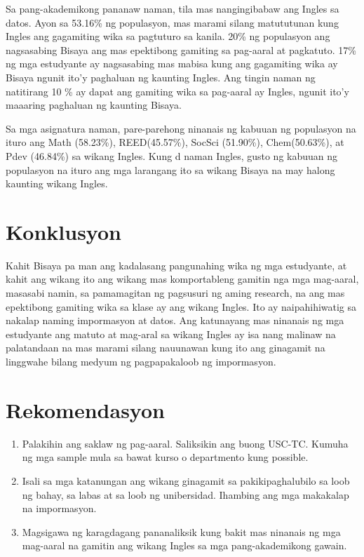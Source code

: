 \documentclass [british, 11pt] {report}
\begin{document}
Sa pang-akademikong pananaw naman, tila mas nangingibabaw ang Ingles sa datos.
Ayon sa 53.16\% ng populasyon, mas marami silang matututunan kung Ingles ang
gagamiting wika sa pagtuturo sa kanila. 20\% ng populasyon ang nagsasabing
Bisaya ang mas epektibong gamiting sa pag-aaral at pagkatuto. 17\% ng mga
estudyante ay nagsasabing mas mabisa kung ang gagamiting wika ay Bisaya ngunit
ito'y paghaluan ng kaunting Ingles. Ang tingin naman ng natitirang 10 \% ay
dapat ang gamiting wika sa pag-aaral ay Ingles, ngunit ito'y maaaring paghaluan
ng kaunting Bisaya.

Sa mga asignatura naman, pare-parehong ninanais ng kabuuan ng populasyon na
ituro ang Math (58.23\%), REED(45.57\%), SocSci (51.90\%), Chem(50.63\%), at
Pdev (46.84\%) sa wikang Ingles. Kung d naman Ingles, gusto ng kabuuan ng
populasyon na ituro ang mga larangang ito sa wikang Bisaya na may halong
kaunting wikang Ingles.
\section{Konklusyon}
Kahit Bisaya pa man ang kadalasang pangunahing wika ng mga estudyante, at kahit
ang wikang ito ang wikang mas komportableng gamitin nga mga mag-aaral, masasabi
namin, sa pamamagitan ng pagsusuri ng aming research, na ang mas epektibong
gamiting wika sa klase ay ang wikang Ingles. Ito ay naipahihiwatig sa nakalap
naming impormasyon at datos. Ang katunayang mas ninanais ng mga estudyante ang
matuto at mag-aral sa wikang Ingles ay isa nang malinaw na palatandaan na mas
marami silang nauunawan kung ito ang ginagamit na linggwahe bilang medyum ng
pagpapakaloob ng impormasyon.
\section{Rekomendasyon}
\begin{enumerate}
\item Palakihin ang saklaw ng pag-aaral. Saliksikin ang buong USC-TC. Kumuha ng
  mga sample mula sa bawat kurso o departmento kung possible.
\item Isali sa mga katanungan ang wikang ginagamit sa pakikipaghalubilo sa loob
  ng bahay, sa labas at sa loob ng unibersidad. Ihambing ang mga makakalap na
  impormasyon.
\item Magsigawa ng karagdagang pananaliksik kung bakit mas ninanais ng mga
  mag-aaral na gamitin ang wikang Ingles sa mga pang-akademikong gawain.
\end{enumerate}
 
\printbibliography[title = {LISTAHAN NG SANGGUNIAN}]
\end{document}
